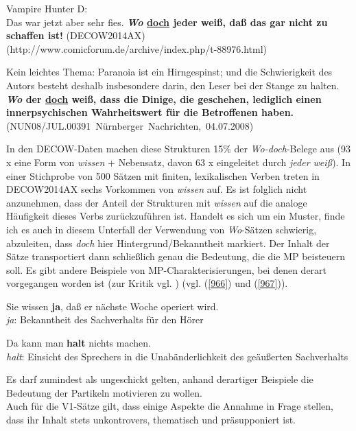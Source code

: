 {\begin{exe}
	\ex\label{964}
	\scriptsize
	Vampire Hunter D:\\
	Das war jetzt aber sehr fies. \textbf{\textit{Wo} \underline{doch} jeder weiß, daß das gar nicht zu schaffen ist!}		
	\hfill\hbox{(DECOW2014AX)}
	\newline
	\hbox{}\hfill\hbox{(http://www.comicforum.de/archive/index.php/t-88976.html)}
\end{exe}				               

\begin{exe}
	\ex\label{965}
	\scriptsize
	Kein leichtes Thema: Paranoia ist ein Hirngespinst; und die Schwierigkeit des Autors besteht deshalb insbesondere darin, den Leser bei der Stange zu 		halten. \textbf{\textit{Wo} der \underline{doch} weiß, dass die Dinige, die geschehen, lediglich einen innerpsychischen Wahrheitswert für die 				Betroffenen haben.}
	\newline
	\hbox{}\hfill\hbox{(NUN08/JUL.00391 Nürnberger Nachrichten, 04.07.2008)}
\end{exe}				               		                            
In den DECOW-Daten machen diese Strukturen 15\% der \textit{Wo-doch}-Belege aus (93 x eine Form von \textit{wissen} + Nebensatz, davon 63 x eingeleitet durch \textit{jeder weiß}). In einer Stichprobe von 500 Sätzen mit finiten, lexikalischen Verben treten in DECOW2014AX sechs Vorkommen von \textit{wissen} auf. Es ist folglich nicht anzunehmen, dass der Anteil der Strukturen mit \textit{wissen} auf die analoge Häufigkeit dieses Verbs zurückzuführen ist. Handelt es sich um ein Muster, finde ich es auch in diesem Unterfall der Verwendung von \textit{Wo}-Sätzen schwierig, abzuleiten, dass \textit{doch} hier Hintergrund/Bekanntheit  markiert. Der Inhalt der Sätze transportiert dann schließ\-lich genau die Bedeutung, die die MP beisteuern soll. Es gibt andere Beispiele von MP-Charakterisierungen, bei denen derart vorgegangen worden ist (zur Kritik vgl. \citealt[380]{Ickler1994}) (vgl. (\ref{966}) und (\ref{967})).

\begin{exe}
	\ex\label{966}
	Sie wissen \textbf{ja}, daß er nächste Woche operiert wird.\\
	\textit{ja}: Bekanntheit des Sachverhalts für den Hörer
\end{exe}	

\begin{exe}
	\ex\label{967}
	Da kann man \textbf{halt} nichts machen.\\
	\textit{halt}: Einsicht des Sprechers in die Unabänderlichkeit des geäußerten Sachverhalts
	\hfill\hbox{\citet[380]{Ickler1994}}
\end{exe}
Es darf zumindest als ungeschickt gelten, anhand derartiger Beispiele die Bedeutung der Partikeln motivieren zu wollen.\\
\newline
\noindent
Auch für die V1-Sätze gilt, dass einige Aspekte die Annahme in Frage stellen, dass ihr Inhalt stets unkontrovers, thematisch und präsupponiert ist.

}
